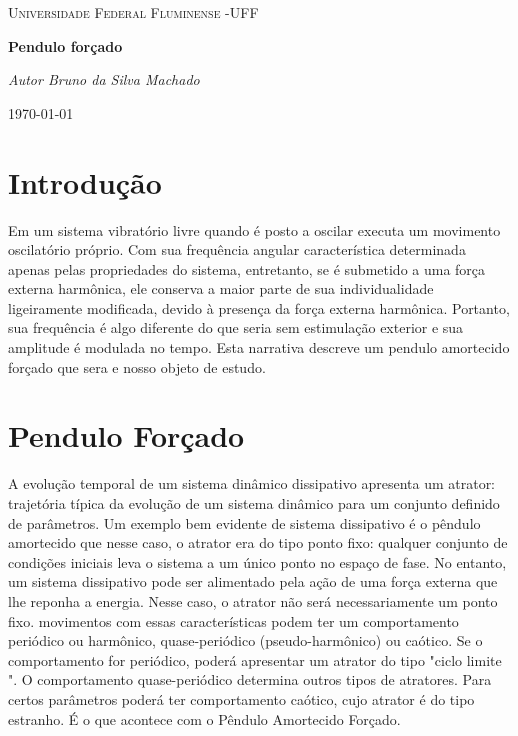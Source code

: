 \documentclass[dvipsnames,a4paper,12pt]{article}
\begin{document}

\author{Bruno da silva}

\selectfont
\begin{titlepage}
	\begin{center}
		{\scshape\Large Universidade Federal Fluminense -UFF \par}
		\vspace{7cm}
		{\huge\bfseries Pendulo forçado \par}
		\vspace{5.5cm}
		{\itshape Autor Bruno da Silva Machado \par}      
			
		\vspace{6.5cm}    
			
		\vfill
		{\large \today\par}
	\end{center}
\end{titlepage}

\setcounter{secnumdepth}{0}
\section{Introdu\c{c}\~{a}o}
\noindent

Em  um sistema vibratório livre quando é posto a oscilar executa um movimento oscilatório próprio. Com sua frequência angular característica determinada apenas pelas propriedades do sistema, entretanto, se é submetido a uma força externa harmônica, ele conserva a maior parte de sua individualidade ligeiramente modificada, devido à presença da força externa harmônica. Portanto, sua frequência é algo diferente do que seria sem estimulação exterior e sua amplitude é modulada no tempo. Esta narrativa descreve um pendulo amortecido forçado que sera e nosso objeto de estudo.
\noindent \eject 

\section{Pendulo Forçado}
\noindent 

A evolução temporal de um sistema dinâmico dissipativo apresenta um atrator: trajetória típica da evolução de um sistema dinâmico para um conjunto definido de parâmetros. Um exemplo bem evidente de sistema dissipativo é o pêndulo amortecido que nesse caso, o atrator era do tipo ponto fixo: qualquer conjunto de condições iniciais leva o sistema a um único ponto no espaço de fase.  
No entanto, um sistema dissipativo pode ser alimentado pela ação de uma força externa que lhe reponha a energia. Nesse caso, o atrator não será necessariamente um ponto fixo. movimentos com essas características podem ter um comportamento periódico ou harmônico, quase-periódico (pseudo-harmônico) ou caótico.  Se o comportamento for periódico, poderá apresentar um atrator do tipo "ciclo limite ". O comportamento quase-periódico determina outros tipos de atratores. Para certos parâmetros poderá ter comportamento caótico, cujo atrator é do tipo estranho. É o que acontece com o Pêndulo Amortecido Forçado.
\end{document}
